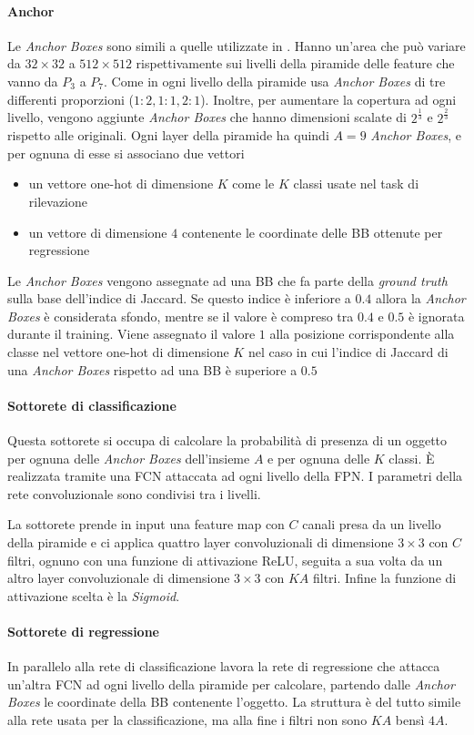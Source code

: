 \paragraph{Anchor}
Le \textit{Anchor Boxes} sono simili a quelle utilizzate in \cite{lin2017feature}. Hanno un'area che può variare da $32 \times 32$ a $512 \times 512$ rispettivamente sui livelli della piramide delle feature che vanno da $P_3$ a $P_7$. Come in \cite{lin2017feature} ogni livello della piramide usa \textit{Anchor Boxes} di tre differenti proporzioni ($1:2, 1:1, 2:1$). Inoltre, per aumentare la copertura ad ogni livello, vengono aggiunte \textit{Anchor Boxes} che hanno dimensioni scalate di $2^\frac{1}{3}$ e $2^\frac{2}{3}$ rispetto alle originali. Ogni layer della piramide ha quindi $A=9$ \textit{Anchor Boxes}, e per ognuna di esse si associano due vettori 
\begin{itemize}
    \item un vettore one-hot di dimensione $K$ come le $K$ classi usate nel task di rilevazione
    \item un vettore di dimensione $4$ contenente le coordinate delle \ac{BB} ottenute per regressione
\end{itemize}
Le \textit{Anchor Boxes} vengono assegnate ad una \ac{BB} che fa parte della \textit{ground truth} sulla base dell'indice di Jaccard. Se questo indice è inferiore a $0.4$ allora la \textit{Anchor Boxes} è considerata sfondo, mentre se il valore è compreso tra $0.4$ e $0.5$ è ignorata durante il training.
Viene assegnato il valore $1$ alla posizione corrispondente alla classe nel vettore one-hot di dimensione $K$ nel caso in cui l'indice di Jaccard di una \textit{Anchor Boxes} rispetto ad una \ac{BB} è superiore a $0.5$

\paragraph{Sottorete di classificazione}
Questa sottorete si occupa di calcolare la probabilità di presenza di un oggetto per ognuna delle \textit{Anchor Boxes} dell'insieme $A$ e per ognuna delle $K$ classi. È realizzata tramite una \ac{FCN} attaccata ad ogni livello della \ac{FPN}. I parametri della rete convoluzionale sono condivisi tra i livelli. 

La sottorete prende in input una feature map con $C$ canali presa da un livello della piramide e ci applica quattro layer convoluzionali di dimensione $3 \times 3$ con $C$ filtri, ognuno con una funzione di attivazione ReLU, seguita a sua volta da un altro layer convoluzionale di dimensione $3 \times 3$ con $KA$ filtri. 
Infine la funzione di attivazione scelta è la \textit{Sigmoid}.
\paragraph{Sottorete di regressione}
In parallelo alla rete di classificazione lavora la rete di regressione che attacca un'altra \ac{FCN} ad ogni livello della piramide per calcolare, partendo dalle \textit{Anchor Boxes} le coordinate della \ac{BB} contenente l'oggetto. La struttura è del tutto simile alla rete usata per la classificazione, ma alla fine i filtri non sono $KA$ bensì $4A$. 


